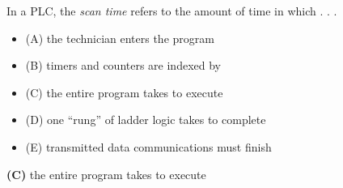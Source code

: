

In a PLC, the {\it scan time} refers to the amount of time in which . . .

\begin{itemize}
\item{(A)} the technician enters the program
\vskip 5pt 
\item{(B)} timers and counters are indexed by
\vskip 5pt 
\item{(C)} the entire program takes to execute
\vskip 5pt 
\item{(D)} one ``rung'' of ladder logic takes to complete
\vskip 5pt 
\item{(E)} transmitted data communications must finish
\end{itemize}







{\bf (C)} the entire program takes to execute
 










